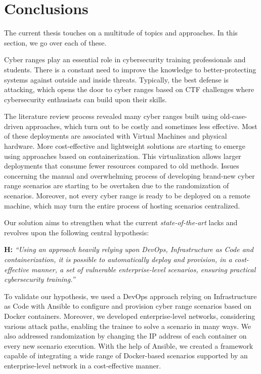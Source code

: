 \chapter{Conclusions}\label{chap:conclusion}

\minitoc

\hfill

The current thesis touches on a multitude of topics and approaches. In this section, we go over each of these.

Cyber ranges play an essential role in cybersecurity training professionals and students. There is a constant need to improve the knowledge to better-protecting systems against outside and inside threats. Typically, the best defense is attacking, which opens the door to cyber ranges based on CTF challenges where cybersecurity enthusiasts can build upon their skills.

The literature review process revealed many cyber ranges built using old-case-driven approaches, which turn out to be costly and sometimes less effective. Most of these deployments are associated with Virtual Machines and physical hardware. More cost-effective and lightweight solutions are starting to emerge using approaches based on containerization. This virtualization allows larger deployments that consume fewer resources compared to old methods. Issues concerning the manual and overwhelming process of developing brand-new cyber range scenarios are starting to be overtaken due to the randomization of scenarios. Moreover, not every cyber range is ready to be deployed on a remote machine, which may turn the entire process of hosting scenarios centralized.

Our solution aims to strengthen what the current \textit{state-of-the-art} lacks and revolves upon the following central hypothesis:\\

\leftskip=1.25cm\rightskip=1.25cm

\textbf{H:} \textit{``Using an approach heavily relying upon DevOps, Infrastructure as Code and containerization, it is possible to automatically deploy and provision, in a cost-effective manner, a set of vulnerable enterprise-level scenarios, ensuring practical cybersecurity training.''}\\

\leftskip=0cm\rightskip=0cm

To validate our hypothesis, we used a DevOps approach relying on Infrastructure as Code with Ansible to configure and provision cyber range scenarios based on Docker containers. Moreover, we developed enterprise-level networks, considering various attack paths, enabling the trainee to solve a scenario in many ways. We also addressed randomization by changing the IP address of each container on every new scenario execution. With the help of Ansible, we created a framework capable of integrating a wide range of Docker-based scenarios supported by an enterprise-level network in a cost-effective manner.

